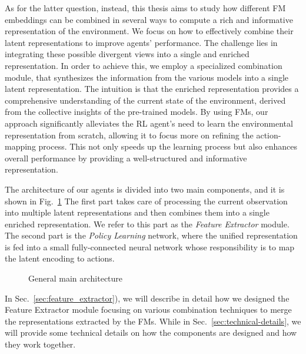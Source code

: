 As for the latter question, instead, this thesis aims to study how different FM embeddings can be combined in several ways to compute a rich and informative representation of the environment.
We focus on how to effectively combine their latent representations to improve agents' performance.
The challenge lies in integrating these possible divergent views into a single and enriched representation.
In order to achieve this, we employ a specialized combination module, that synthesizes the information from the various models into a single latent representation.
The intuition is that the enriched representation provides a comprehensive understanding of the current state of the environment, derived from the collective insights of the pre-trained models.
By using FMs, our approach significantly alleviates the RL agent's need to learn the environmental representation from scratch, allowing it to focus more on refining the action-mapping process.
This not only speeds up the learning process but also enhances overall performance by providing a well-structured and informative representation.

The architecture of our agents is divided into two main components, and it is shown in Fig.~\ref{fig:main}
The first part takes care of processing the current observation into multiple latent representations and then combines them into a single enriched representation.
We refer to this part as the \textit{Feature Extractor} module.
The second part is the \textit{Policy Learning} network, where the unified representation is fed into a small fully-connected neural network whose responsibility is to map the latent encoding to actions.


\begin{figure}[ht]
    \begin{center}
        \fbox{\rule[-.5cm]{0cm}{4cm} \rule[-.5cm]{4cm}{0cm}}
    \end{center}
    \caption{General main architecture}
    \label{fig:main}
\end{figure}


In Sec.~\ref{sec:feature_extractor}), we will describe in detail how we designed the Feature Extractor module focusing on various combination techniques to merge the representations extracted by the FMs.
While in Sec.~\ref{sec:technical-details}, we will provide some technical details on how the components are designed and how they work together.




